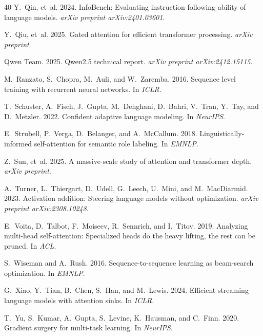 \documentclass[11pt]{article}
\begin{document}
\begin{thebibliography}{40}
Y.~Qin, et~al. 2024.
\newblock InfoBench: Evaluating instruction following ability of language models.
\newblock \emph{arXiv preprint arXiv:2401.03601}.

Y.~Qiu, et~al. 2025.
\newblock Gated attention for efficient transformer processing.
\newblock \emph{arXiv preprint}.

Qwen Team. 2025.
\newblock Qwen2.5 technical report.
\newblock \emph{arXiv preprint arXiv:2412.15115}.

M.~Ranzato, S.~Chopra, M.~Auli, and W.~Zaremba. 2016.
\newblock Sequence level training with recurrent neural networks.
\newblock In \emph{ICLR}.

T.~Schuster, A.~Fisch, J.~Gupta, M.~Dehghani, D.~Bahri, V.~Tran, Y.~Tay, and D.~Metzler. 2022.
\newblock Confident adaptive language modeling.
\newblock In \emph{NeurIPS}.

E.~Strubell, P.~Verga, D.~Belanger, and A.~McCallum. 2018.
\newblock Linguistically-informed self-attention for semantic role labeling.
\newblock In \emph{EMNLP}.

Z.~Sun, et~al. 2025.
\newblock A massive-scale study of attention and transformer depth.
\newblock \emph{arXiv preprint}.

A.~Turner, L.~Thiergart, D.~Udell, G.~Leech, U.~Mini, and M.~MacDiarmid. 2023.
\newblock Activation addition: Steering language models without optimization.
\newblock \emph{arXiv preprint arXiv:2308.10248}.

E.~Voita, D.~Talbot, F.~Moiseev, R.~Sennrich, and I.~Titov. 2019.
\newblock Analyzing multi-head self-attention: Specialized heads do the heavy lifting, the rest can be pruned.
\newblock In \emph{ACL}.

S.~Wiseman and A.~Rush. 2016.
\newblock Sequence-to-sequence learning as beam-search optimization.
\newblock In \emph{EMNLP}.

G.~Xiao, Y.~Tian, B.~Chen, S.~Han, and M.~Lewis. 2024.
\newblock Efficient streaming language models with attention sinks.
\newblock In \emph{ICLR}.

T.~Yu, S.~Kumar, A.~Gupta, S.~Levine, K.~Hausman, and C.~Finn. 2020.
\newblock Gradient surgery for multi-task learning.
\newblock In \emph{NeurIPS}.

\end{thebibliography}
\end{document}
